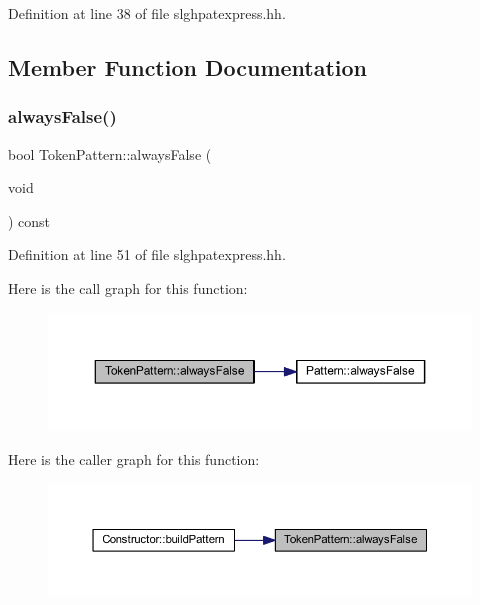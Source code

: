 Definition at line 38 of file slghpatexpress.\+hh.



\subsection{Member Function Documentation}
\mbox{\label{class_token_pattern_a9a4306ae8cae75e5597e5a83ceac491e}} 
\subsubsection{\texorpdfstring{alwaysFalse()}{alwaysFalse()}}
{\footnotesize\ttfamily bool Token\+Pattern\+::always\+False (\begin{DoxyParamCaption}\item[{void}]{ }\end{DoxyParamCaption}) const\hspace{0.3cm}{\ttfamily [inline]}}



Definition at line 51 of file slghpatexpress.\+hh.

Here is the call graph for this function\+:
\nopagebreak
\begin{figure}[H]
\begin{center}
\leavevmode
\includegraphics[width=350pt]{class_token_pattern_a9a4306ae8cae75e5597e5a83ceac491e_cgraph}
\end{center}
\end{figure}
Here is the caller graph for this function\+:
\nopagebreak
\begin{figure}[H]
\begin{center}
\leavevmode
\includegraphics[width=350pt]{class_token_pattern_a9a4306ae8cae75e5597e5a83ceac491e_icgraph}
\end{center}
\end{figure}
\mbox{\label{class_token_pattern_ab58b4509cd534fa626618afd06cd37cd}} 
